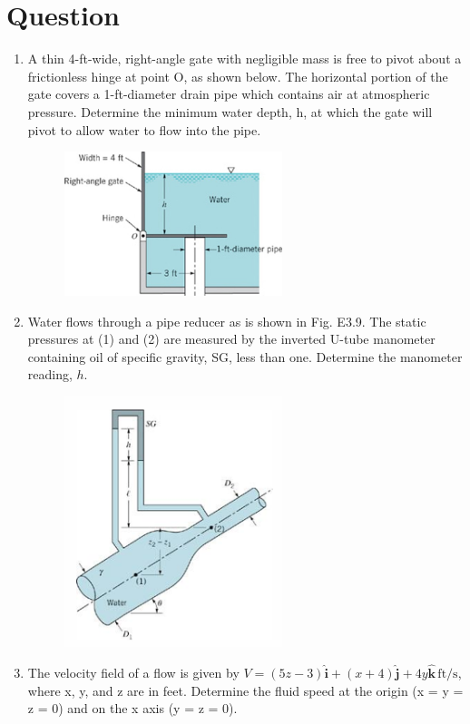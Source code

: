 \documentclass[12pt,a4paper]{article}
\newcounter{question}
\newenvironment{questions}{
    \setcounter{question}{0}
    \section*{Question}
    \begin{enumerate}[leftmargin=1.5em,label={\arabic*．}]
}{
    \end{enumerate}
}
\begin{document}
\begin{questions}
  \item A thin 4-ft-wide, right-angle gate with negligible mass is free to pivot about a frictionless hinge at point O, as shown below. The horizontal portion of the gate covers a 1-ft-diameter drain pipe which contains air at atmospheric pressure. Determine the minimum water depth, h, at which the gate will pivot to allow water to flow into the pipe. 
  \begin{figure}[H]
    \centering
    \includegraphics[width=0.6\textwidth]{./figures/4.png}
  \end{figure}

  \item Water flows through a pipe reducer as is shown in Fig. E3.9. The static pressures at (1) and (2) are measured by the inverted U-tube manometer containing oil of specific gravity, SG, less than one. Determine the manometer reading, \( h \).
  
  \begin{figure}[H]
    \centering
    \includegraphics[width=0.6\textwidth]{./figures/8.png}
  \end{figure}

  \item The velocity field of a flow is given by $V = ( 5 z - 3 ) \hat { \mathbf { i } } + ( x + 4 ) \hat { \mathbf { j } } + 4 y \hat { \mathbf { k } } \, \mathrm { f t } / \mathrm { s }$, where x, y, and z are in feet. Determine the fluid speed at the origin (x = y = z = 0) and on the x axis (y = z = 0). 


\end{questions}
\end{document}
